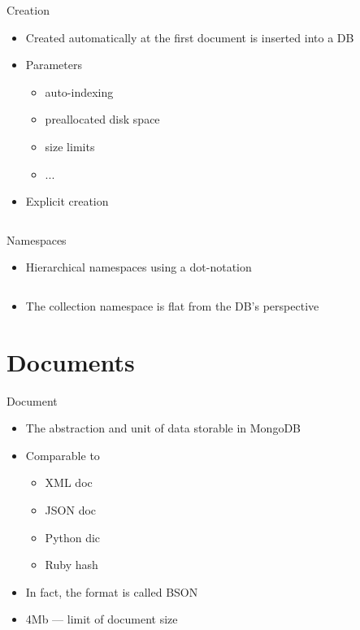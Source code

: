 \documentclass[sans]{beamer}
\begin{document}
\begin{frame}{Creation}
	\begin{itemize}
		\item Created automatically at the first document is inserted into a DB
		\item Parameters
		\begin{itemize}
			\item auto-indexing
			\item preallocated disk space
			\item size limits
			\item ...			
		\end{itemize}

		\item Explicit creation
		\inputminted[fontsize=\footnotesize]{js}{codes/creation.js}
	\end{itemize}
\end{frame}

\begin{frame}{Namespaces}
	\begin{itemize}
		\item Hierarchical namespaces using a dot-notation
		\inputminted[fontsize=\footnotesize]{js}{codes/hier.js}
		\item The collection namespace is flat from the DB's perspective
	\end{itemize}
\end{frame}

\section{Documents}

\begin{frame}{Document}
	\begin{itemize}
		\item The abstraction and unit of data storable in MongoDB
		\item Comparable to
		\begin{itemize}
			\item XML doc
			\item JSON doc
			\item Python dic
			\item Ruby hash
		\end{itemize}
		\item In fact, the format is called BSON
		\item 4Mb --- limit of document size
	\end{itemize}
\end{frame}
\end{document}
